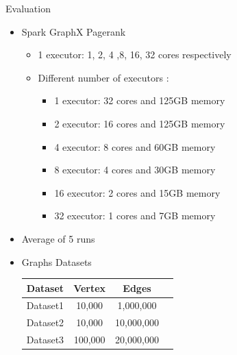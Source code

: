 \documentclass{beamer}
\begin{document}
\begin{frame}{Evaluation}
    \begin{itemize}
            \begin{itemize}
                \item{Spark GraphX Pagerank}
                    \begin{itemize}
                        \item{1 executor: 1, 2, 4 ,8, 16, 32 cores respectively}
                        \item{Different number of executors :}
                            \begin{itemize}
                                \item{1 executor: 32 cores and 125GB memory}
                                \item{2 executor: 16 cores and 125GB memory}
                                \item{4 executor: 8 cores and 60GB memory}
                                \item{8 executor: 4 cores and 30GB memory}
                                \item{16 executor: 2 cores and 15GB memory}
                                \item{32 executor: 1 cores and 7GB memory}
                            \end{itemize}
                    \end{itemize}

                \item{Average of 5 runs}

                \item{Graphs Datasets}
                    \begin{table}
                        \centering
                        \begin{tabular}{|l|c|c|c|}
                            \hline
                            \rowcolor{blue} 
                            \color{white}\textbf{Dataset} &\color{white}
                            \textbf{Vertex} &\color{white} \textbf{Edges} \\
                            \hline
                            Dataset1   &10,000   &1,000,000 \\
                            \hline
                            Dataset2  &10,000  &10,000,000 \\
                            \hline
                            Dataset3   &100,000  &20,000,000 \\
                            \hline
                        \end{tabular}
                    \end{table}


            \end{itemize}
    \end{itemize}
\end{frame}
\end{document}
